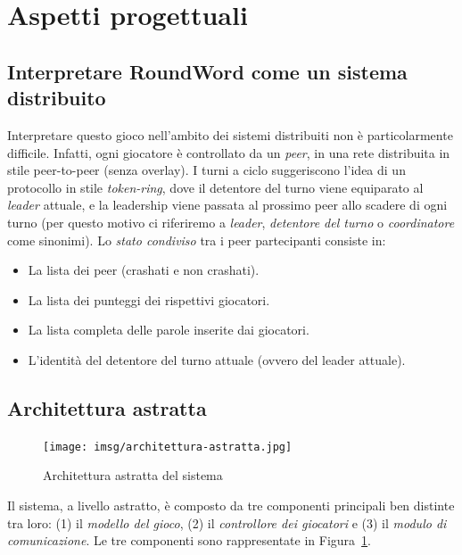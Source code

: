 \documentclass[10.5pt]{article}
\begin{document}
\section{Aspetti progettuali}

\subsection{Interpretare RoundWord come un sistema distribuito}
Interpretare questo gioco nell'ambito dei sistemi distribuiti non è particolarmente difficile. Infatti, ogni giocatore è controllato da un \emph{peer}, in una rete distribuita in stile peer-to-peer (senza overlay). I turni a ciclo suggeriscono l'idea di un protocollo in stile \emph{token-ring}, dove il detentore del turno viene equiparato al \emph{leader} attuale, e la leadership viene passata al prossimo peer allo scadere di ogni turno (per questo motivo ci riferiremo a \emph{leader}, \emph{detentore del turno} o \emph{coordinatore} come sinonimi). Lo \emph{stato condiviso} tra i peer partecipanti consiste in:
\begin{itemize}
\item La lista dei peer (crashati e non crashati).
\item La lista dei punteggi dei rispettivi giocatori.
\item La lista completa delle parole inserite dai giocatori.
\item L'identità del detentore del turno attuale (ovvero del leader attuale).
\end{itemize}


\subsection{Architettura astratta}

\begin{figure}
\centering
\texttt{[image: imsg/architettura-astratta.jpg]}
\caption{Architettura astratta del sistema}
\label{img:architettura-astratta}
\end{figure}

Il sistema, a livello astratto, è composto da tre componenti principali ben distinte tra loro: (1) il \emph{modello del gioco}, (2) il \emph{controllore dei giocatori} e (3) il \emph{modulo di comunicazione}. Le tre componenti sono rappresentate in Figura~\ref{img:architettura-astratta}.
\end{document}
